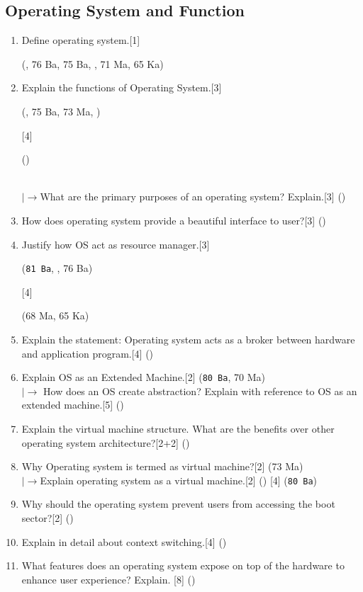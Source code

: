 \documentclass[12pt]{article}
\newcommand{\lb}{\left|\rightarrow\right.}
\begin{document}
\subsection{Operating System and Function}
\begin{enumerate}
\item Define operating system.\hfill[1] \begin{footnotesize}(, 76 Ba, 75 Ba, , 71 Ma, 65 Ka)\end{footnotesize}
\item Explain the functions of Operating System.\hfill[3] \begin{footnotesize}(, 75 Ba, 73 Ma, )\end{footnotesize} [4] \begin{footnotesize}()\end{footnotesize} \\
$\lb$What are the primary purposes of an operating system? Explain.\hfill[3] ()
\item How does operating system provide a beautiful interface to user?\hfill[3] ()
\item Justify how OS act as resource manager.\hfill[3]\begin{small} (\texttt{81 Ba}, , 76 Ba)\end{small} [4]\begin{small} (68 Ma, 65 Ka)\end{small}
\item Explain the statement: Operating system acts as a broker between hardware and application program.\hfill[4] ()
\item Explain OS as an Extended Machine.\hfill[2] (\texttt{80 Ba}, 70 Ma)\\
$\lb$ How does an OS create abstraction? Explain with reference to OS as an extended machine.\hfill[5] ()
\item Explain the virtual machine structure. What are the benefits over other operating system architecture?\hfill[2+2] ()
\item Why Operating system is termed as virtual machine?\hfill[2] (73 Ma)\\
$\lb$Explain operating system as a virtual machine.\hfill[2] () [4] (\texttt{80 Ba})

\item Why should the operating system prevent users from accessing the boot sector?\hfill[2] ()
\item Explain in detail about context switching.\hfill[4] ()
\item What features does an operating system expose on top of the hardware to enhance user experience? Explain. \hfill[8] ()
\end{enumerate}
\end{document}
